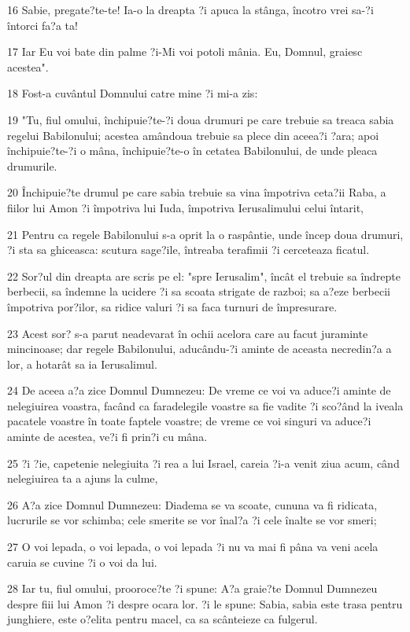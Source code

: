 \par 16 Sabie, pregate?te-te! Ia-o la dreapta ?i apuca la stânga, încotro vrei sa-?i întorci fa?a ta!
\par 17 Iar Eu voi bate din palme ?i-Mi voi potoli mânia. Eu, Domnul, graiesc acestea".
\par 18 Fost-a cuvântul Domnului catre mine ?i mi-a zis:
\par 19 "Tu, fiul omului, închipuie?te-?i doua drumuri pe care trebuie sa treaca sabia regelui Babilonului; acestea amândoua trebuie sa plece din aceea?i ?ara; apoi închipuie?te-?i o mâna, închipuie?te-o în cetatea Babilonului, de unde pleaca drumurile.
\par 20 Închipuie?te drumul pe care sabia trebuie sa vina împotriva ceta?ii Raba, a fiilor lui Amon ?i împotriva lui Iuda, împotriva Ierusalimului celui întarit,
\par 21 Pentru ca regele Babilonului s-a oprit la o raspântie, unde încep doua drumuri, ?i sta sa ghiceasca: scutura sage?ile, întreaba terafimii ?i cerceteaza ficatul.
\par 22 Sor?ul din dreapta are scris pe el: "spre Ierusalim", încât el trebuie sa îndrepte berbecii, sa îndemne la ucidere ?i sa scoata strigate de razboi; sa a?eze berbecii împotriva por?ilor, sa ridice valuri ?i sa faca turnuri de împresurare.
\par 23 Acest sor? s-a parut neadevarat în ochii acelora care au facut juraminte mincinoase; dar regele Babilonului, aducându-?i aminte de aceasta necredin?a a lor, a hotarât sa ia Ierusalimul.
\par 24 De aceea a?a zice Domnul Dumnezeu: De vreme ce voi va aduce?i aminte de nelegiuirea voastra, facând ca faradelegile voastre sa fie vadite ?i sco?ând la iveala pacatele voastre în toate faptele voastre; de vreme ce voi singuri va aduce?i aminte de acestea, ve?i fi prin?i cu mâna.
\par 25 ?i ?ie, capetenie nelegiuita ?i rea a lui Israel, careia ?i-a venit ziua acum, când nelegiuirea ta a ajuns la culme,
\par 26 A?a zice Domnul Dumnezeu: Diadema se va scoate, cununa va fi ridicata, lucrurile se vor schimba; cele smerite se vor înal?a ?i cele înalte se vor smeri;
\par 27 O voi lepada, o voi lepada, o voi lepada ?i nu va mai fi pâna va veni acela caruia se cuvine ?i o voi da lui.
\par 28 Iar tu, fiul omului, prooroce?te ?i spune: A?a graie?te Domnul Dumnezeu despre fiii lui Amon ?i despre ocara lor. ?i le spune: Sabia, sabia este trasa pentru junghiere, este o?elita pentru macel, ca sa scânteieze ca fulgerul.
